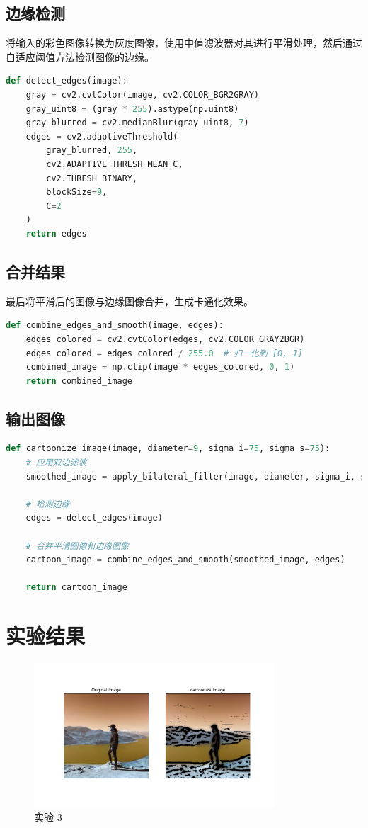 \documentclass[a4paper,12pt]{report}
\begin{document}
\subsection{边缘检测}
将输入的彩色图像转换为灰度图像，使用中值滤波器对其进行平滑处理，然后通过自适应阈值方法检测图像的边缘。
\begin{lstlisting}[language=Python]
def detect_edges(image):
    gray = cv2.cvtColor(image, cv2.COLOR_BGR2GRAY)
    gray_uint8 = (gray * 255).astype(np.uint8)
    gray_blurred = cv2.medianBlur(gray_uint8, 7)
    edges = cv2.adaptiveThreshold(
        gray_blurred, 255,
        cv2.ADAPTIVE_THRESH_MEAN_C,
        cv2.THRESH_BINARY,
        blockSize=9,
        C=2
    )
    return edges
\end{lstlisting}

\subsection{合并结果}
最后将平滑后的图像与边缘图像合并，生成卡通化效果。
\begin{lstlisting}[language=Python]
def combine_edges_and_smooth(image, edges):
    edges_colored = cv2.cvtColor(edges, cv2.COLOR_GRAY2BGR)
    edges_colored = edges_colored / 255.0  # 归一化到 [0, 1]
    combined_image = np.clip(image * edges_colored, 0, 1)
    return combined_image
\end{lstlisting}

\subsection{输出图像}
\begin{lstlisting}[language=Python]
def cartoonize_image(image, diameter=9, sigma_i=75, sigma_s=75):
    # 应用双边滤波
    smoothed_image = apply_bilateral_filter(image, diameter, sigma_i, sigma_s)
    
    # 检测边缘
    edges = detect_edges(image)
    
    # 合并平滑图像和边缘图像
    cartoon_image = combine_edges_and_smooth(smoothed_image, edges)
    
    return cartoon_image
\end{lstlisting}


\section{实验结果}
\begin{figure}[H]
    \centering
    \includegraphics[width=0.8\textwidth]{figure/res_1.png}
    \caption{实验 3}
    \label{fig:login}
\end{figure}
\end{document}
